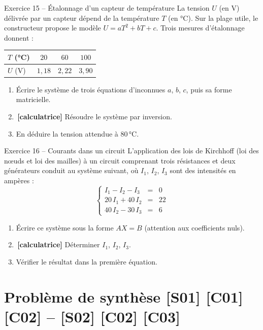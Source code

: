 \documentclass[a4paper,11pt]{article}
\newcommand{\calc}{\,{\color{uimmred}\small\textbf{[calculatrice]}}}
\begin{document}
\begin{exo}{Exercice 15 -- Étalonnage d'un capteur de température}
\label{exo:15}
La tension $U$ (en V) délivrée par un capteur dépend de la température $T$ (en °C). Sur la plage utile, le constructeur propose le modèle $U = aT^2 + bT + c$. Trois mesures d'étalonnage donnent :
\begin{center}
\renewcommand{\arraystretch}{1.3}
\begin{tabular}{|l|c|c|c|}
\hline
\rowcolor{uimmlightblue}
$T$ (°C) & $20$ & $60$ & $100$ \\
\hline
$U$ (V) & $1{,}18$ & $2{,}22$ & $3{,}90$ \\
\hline
\end{tabular}
\end{center}
\begin{enumerate}[label=\alph*)]
  \item Écrire le système de trois équations d'inconnues $a$, $b$, $c$, puis sa forme matricielle.
  \item \calc{} Résoudre le système par inversion.
  \item En déduire la tension attendue à $80$\,°C.
\end{enumerate}
\end{exo}

\begin{exo}{Exercice 16 -- Courants dans un circuit}
\label{exo:16}
L'application des lois de Kirchhoff (loi des nœuds et loi des mailles) à un circuit comprenant trois résistances et deux générateurs conduit au système suivant, où $I_1$, $I_2$, $I_3$ sont des intensités en ampères :
\[
\left\{\begin{array}{rcl} I_1 - I_2 - I_3 &=& 0\\ 20\,I_1 + 40\,I_2 &=& 22\\ 40\,I_2 - 30\,I_3 &=& 6\end{array}\right.
\]
\begin{enumerate}[label=\alph*)]
  \item Écrire ce système sous la forme $AX = B$ (attention aux coefficients nuls).
  \item \calc{} Déterminer $I_1$, $I_2$, $I_3$.
  \item Vérifier le résultat dans la première équation.
\end{enumerate}
\end{exo}

\needspace{7cm}
\section{Problème de synthèse \hfill {\normalsize\color{uimmred}[S01] [C01] [C02] -- [S02] [C02] [C03]}}
\end{document}
